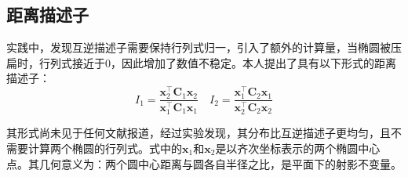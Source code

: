 \documentclass{article}
\begin{document}
\subsection{距离描述子}
实践中，发现互逆描述子需要保持行列式归一，引入了额外的计算量，当椭圆被压扁时，行列式接近于0，因此增加了数值不稳定。本人提出了具有以下形式的距离描述子：
\begin{equation*}
  I_1 = \frac{\mathbf{x}_2^\top\mathbf{C}_1\mathbf{x}_2}{\mathbf{x}_1^\top\mathbf{C}_1\mathbf{x}_1}\quad I_2 = \frac{\mathbf{x}_1^\top\mathbf{C}_2\mathbf{x}_1}{\mathbf{x}_2^\top\mathbf{C}_2\mathbf{x}_2}
\end{equation*}\par
其形式尚未见于任何文献报道，经过实验发现，其分布比互逆描述子更均匀，且不需要计算两个椭圆的行列式。式中的$\mathbf{x}_1$和$\mathbf{x}_2$是以齐次坐标表示的两个椭圆中心点。其几何意义为：两个圆中心距离与圆各自半径之比，是平面下的射影不变量。
\newpage
\printbibliography[heading=bibliography,title=参考文献]
\end{document}
